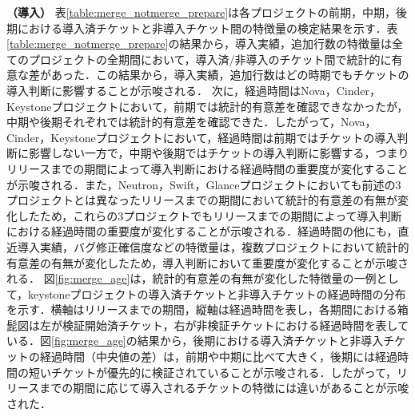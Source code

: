\documentclass[11pt]{jreport}
\begin{document}
\textbf{（導入）} 表\ref{table:merge_notmerge_prepare}は各プロジェクトの前期，中期，後期における導入済チケットと非導入チケット間の特徴量の検定結果を示す．表\ref{table:merge_notmerge_prepare}の結果から，導入実績，追加行数の特徴量は全てのプロジェクトの全期間において，導入済/非導入のチケット間で統計的に有意な差があった．この結果から，導入実績，追加行数はどの時期でもチケットの導入判断に影響することが示唆される．
次に，経過時間はNova，Cinder，Keystoneプロジェクトにおいて，前期では統計的有意差を確認できなかったが，中期や後期それぞれでは統計的有意差を確認できた．したがって，Nova，Cinder，Keystoneプロジェクトにおいて，経過時間は前期ではチケットの導入判断に影響しない一方で，中期や後期ではチケットの導入判断に影響する，つまりリリースまでの期間によって導入判断における経過時間の重要度が変化することが示唆される．また，Neutron，Swift，Glanceプロジェクトにおいても前述の3プロジェクトとは異なったリリースまでの期間において統計的有意差の有無が変化したため，これらの3プロジェクトでもリリースまでの期間によって導入判断における経過時間の重要度が変化することが示唆される．経過時間の他にも，直近導入実績，バグ修正確信度などの特徴量は，複数プロジェクトにおいて統計的有意差の有無が変化したため，導入判断において重要度が変化することが示唆される．
図\ref{fig:merge_age}は，統計的有意差の有無が変化した特徴量の一例として，keystoneプロジェクトの導入済チケットと非導入チケットの経過時間の分布を示す．横軸はリリースまでの期間，縦軸は経過時間を表し，各期間における箱髭図は左が検証開始済チケット，右が非検証チケットにおける経過時間を表している．図\ref{fig:merge_age}の結果から，後期における導入済チケットと非導入チケットの経過時間（中央値の差）は，前期や中期に比べて大きく，後期には経過時間の短いチケットが優先的に検証されていることが示唆される．したがって，リリースまでの期間に応じて導入されるチケットの特徴には違いがあることが示唆された．
\end{document}
